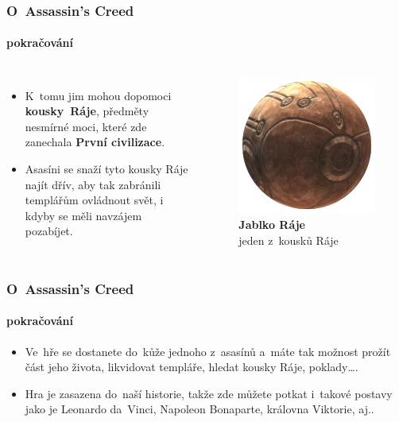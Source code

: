 \documentclass[hyperref={colorlinks, linkcolor=white, urlcolor=green!50!black}]{beamer}
\begin{document}
\begin{frame}
\frametitle{O~Assassin's Creed}
\framesubtitle{pokračování}
\begin{columns}[c]
	
	\begin{itemize}
		\item K~tomu jim mohou dopomoci \textbf{\color{green!50!black} kousky~Ráje}, předměty nesmírné moci, které zde zanechala \textbf{\color{darkred} První civilizace}.
		\item Asasíni se snaží tyto kousky Ráje najít dřív, aby tak zabránili templářům ovládnout svět, i kdyby se měli navzájem pozabíjet.
	\end{itemize}
	
	\begin{figure}[h]
		\centering
		\includegraphics[width=\textwidth]{item_apple}
		\captionsetup{labelformat=empty, justification=centering}
		\caption{\textbf{\color{blendedblue} Jablko Ráje} \\ jeden z~kousků Ráje}
	\end{figure}
	
\end{columns}

\end{frame}

\begin{frame}
\frametitle{O~Assassin's Creed}
\framesubtitle{pokračování}
\begin{itemize}
	\item Ve~hře se dostanete do~kůže jednoho z~asasínů a~máte tak možnost prožít část jeho života, likvidovat templáře, hledat kousky Ráje, poklady\dots .
	\item Hra je zasazena do~naší historie, takže zde můžete potkat i~takové postavy jako je {\color{darkred} Leonardo da~Vinci}, {\color{darkred} Napoleon Bonaparte}, {\color{darkred} královna Viktorie}, aj..
\end{itemize}

\end{frame}
\end{document}
